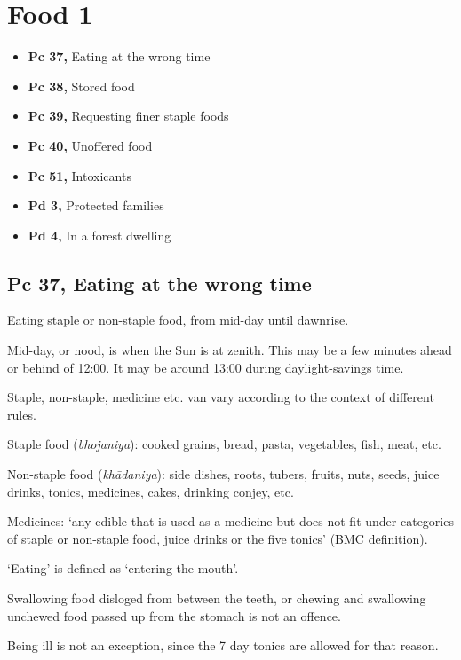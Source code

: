 \chapter{Food 1}

\begin{itemize}
\tightlist
\item
  \textbf{Pc 37,} Eating at the wrong time
\item
  \textbf{Pc 38,} Stored food
\item
  \textbf{Pc 39,} Requesting finer staple foods
\item
  \textbf{Pc 40,} Unoffered food
\item
  \textbf{Pc 51,} Intoxicants
\item
  \textbf{Pd 3,} Protected families
\item
  \textbf{Pd 4,} In a forest dwelling
\end{itemize}


\clearpage

\section{Pc 37, Eating at the wrong time}

Eating staple or non-staple food, from mid-day until dawnrise.

Mid-day, or nood, is when the Sun is at zenith. This may be a few
minutes ahead or behind of 12:00. It may be around 13:00 during
daylight-savings time.

Staple, non-staple, medicine etc. van vary according to the context of
different rules.

Staple food (\emph{bhojaniya}): cooked grains, bread, pasta, vegetables,
fish, meat, etc.

Non-staple food (\emph{khādaniya}): side dishes, roots, tubers, fruits,
nuts, seeds, juice drinks, tonics, medicines, cakes, drinking conjey,
etc.

Medicines: `any edible that is used as a medicine but does not fit under
categories of staple or non-staple food, juice drinks or the five
tonics' (BMC definition).

`Eating' is defined as `entering the mouth'.

Swallowing food disloged from between the teeth, or chewing and
swallowing unchewed food passed up from the stomach is not an offence.

Being ill is not an exception, since the 7 day tonics are allowed for
that reason.

